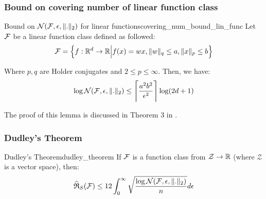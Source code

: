 \subsubsection{Bound on covering number of linear function class}
\begin{lemma}{Bound on $\mathcal{N}(\mathcal{F}, \epsilon, \|.\|_2)$ for linear functions}{covering_num_bound_lin_func}
    Let $\mathcal{F}$ be a linear function class defined as followed:
    \begin{align*}
        \mathcal{F} = \Big\{ 
            f:\mathbb{R}^d\to\mathbb{R} \Big| f(x) = wx, \|w\|_q \le a, \|x\|_p \le b
         \Big\}
    \end{align*}

    \noindent Where $p, q$ are Holder conjugates and $2\le p\le \infty$. Then, we have:
    \begin{align*}
        \log\mathcal{N}(\mathcal{F}, \epsilon, \|.\|_2) \le \Bigg\lceil \frac{a^2b^2}{\epsilon^2} \Bigg\rceil \log(2d+1)
    \end{align*}

    \noindent The proof of this lemma is discussed in Theorem 3 in \cite{article:tong_zhang}.
\end{lemma}

\begin{proof*}
    
\end{proof*}


\subsubsection{Dudley's Theorem}
\begin{theorem}{Dudley's Theorem}{dudley_theorem}
    If $\mathcal{F}$ is a function class from $\mathcal{Z}\to\mathbb{R}$ (where $\mathcal{Z}$ is a vector space), then:
    \begin{align*}
        \widehat{\mathfrak{R}}_S(\mathcal{F}) \le 12\int_0^\infty\sqrt{
            \frac{\log \mathcal{N}(\mathcal{F}, \epsilon, \|.\|_2)}{n}
        }d\epsilon
    \end{align*}
\end{theorem}
\begin{proof*}
    
\end{proof*}

